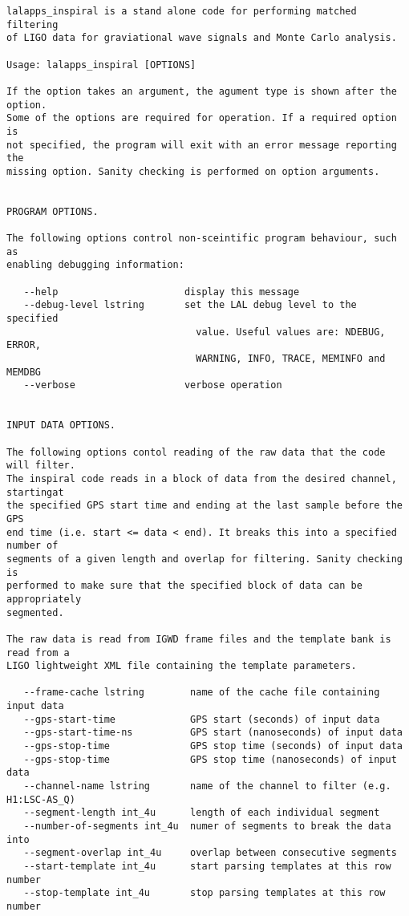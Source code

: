 \begin{verbatim}
lalapps_inspiral is a stand alone code for performing matched filtering
of LIGO data for graviational wave signals and Monte Carlo analysis.

Usage: lalapps_inspiral [OPTIONS]

If the option takes an argument, the agument type is shown after the option.
Some of the options are required for operation. If a required option is
not specified, the program will exit with an error message reporting the
missing option. Sanity checking is performed on option arguments.


PROGRAM OPTIONS.

The following options control non-sceintific program behaviour, such as
enabling debugging information:

   --help                      display this message
   --debug-level lstring       set the LAL debug level to the specified
                                 value. Useful values are: NDEBUG, ERROR,
                                 WARNING, INFO, TRACE, MEMINFO and MEMDBG
   --verbose                   verbose operation


INPUT DATA OPTIONS.

The following options contol reading of the raw data that the code will filter.
The inspiral code reads in a block of data from the desired channel, startingat 
the specified GPS start time and ending at the last sample before the GPS
end time (i.e. start <= data < end). It breaks this into a specified number of 
segments of a given length and overlap for filtering. Sanity checking is 
performed to make sure that the specified block of data can be appropriately
segmented.

The raw data is read from IGWD frame files and the template bank is read from a
LIGO lightweight XML file containing the template parameters.

   --frame-cache lstring        name of the cache file containing input data
   --gps-start-time             GPS start (seconds) of input data
   --gps-start-time-ns          GPS start (nanoseconds) of input data
   --gps-stop-time              GPS stop time (seconds) of input data
   --gps-stop-time              GPS stop time (nanoseconds) of input data
   --channel-name lstring       name of the channel to filter (e.g. H1:LSC-AS_Q)
   --segment-length int_4u      length of each individual segment
   --number-of-segments int_4u  numer of segments to break the data into
   --segment-overlap int_4u     overlap between consecutive segments
   --start-template int_4u      start parsing templates at this row number
   --stop-template int_4u       stop parsing templates at this row number



\end{verbatim}
